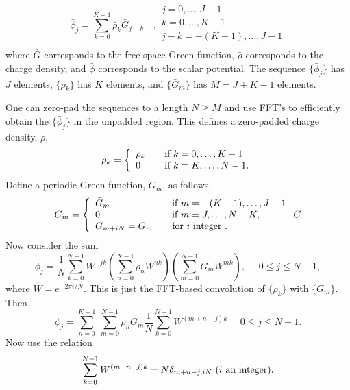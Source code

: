 \begin{equation}
\bar{\phi}_j=\sum_{k=0}^{K-1}\bar{\rho}_k \bar{G}_{j-k}\quad,
\begin{array}{l}
j=0,\ldots,J-1 \\
k=0,\ldots,K-1 \\
j-k=-(K-1),\ldots,J-1 \\
\end{array}
\label{eq:bruteforceconvolution}
\end{equation}
where $\bar{G}$ corresponds to the free space Green function, $\bar{\rho}$ corresponds to the charge density, and $\bar{\phi}$ corresponds to the scalar potential.
The sequence $\{\bar{\phi}_j\}$ has $J$ elements, $\{\bar{\rho}_k\}$ has $K$ elements, and $\{\bar{G}_m\}$ has $M=J+K-1$ elements.

One can zero-pad the sequences to a length $N\ge M$ and use FFT's to efficiently obtain the $\{\bar{\phi}_j\}$ in the unpadded region.
This defines a zero-padded charge density, $\rho$,
\begin{equation}
\rho_k=\left\{
\begin{array}{l l}
\bar{\rho}_k & \quad \text{if }k=0,\ldots,K-1 \\
0 & \quad \text{if }k=K,\ldots,N-1. \\
\end{array}\right.
\end{equation}
Define a periodic Green function, $G_m$, as follows,
\begin{equation}
G_m=\left\{
\begin{array}{l l}
\bar{G}_m & \quad \text{if }m=-(K-1),\ldots,J-1 \\
0 & \quad \text{if }m=J,\ldots,N-K, \\
G_{m+iN}=G_{m} & \quad \text{for } i \text{ integer }.
\end{array}\right.
\label{eq:periodicgreenfunction}G
\end{equation}
Now consider the sum
\begin{equation}
{\phi}_j=\frac{1}{N}\sum_{k=0}^{N-1} W^{-jk}
                    \left(\sum_{n=0}^{N-1} \rho_n W^{nk}\right)
                    \left(\sum_{m=0}^{N-1} G_m W^{mk}\right),
~~~~~~0 \le j \le N-1,
\label{eq:fftconvolution}
\end{equation}
where $W=e^{-2\pi i/N}$. This is just the FFT-based convolution of $\{\rho_k\}$ with $\{G_m\}$.
Then,
\begin{equation}
{\phi}_j=
          \sum_{n=0}^{K-1}~
          \sum_{m=0}^{N-1} \bar{\rho}_n G_m
\frac{1}{N}\sum_{k=0}^{N-1} W^{(m+n-j)k}
~~~~~~0 \le j \le N-1.
\end{equation}
Now use the relation
\begin{equation}
\sum_{k=0}^{N-1} W^{(m+n-j)k}= N \delta_{m+n-j,iN}~~~~~(i~\rm an~integer).
\end{equation}

